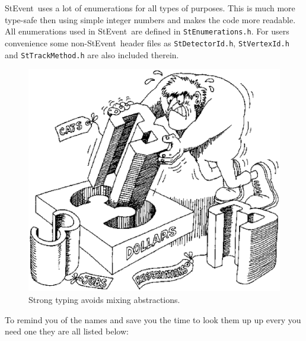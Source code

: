 \documentclass[twoside]{article}
\newcommand{\StEvent}{\textsf{StEvent}}
\begin{document}
\StEvent\ uses a lot of enumerations for all types of purposes. This
is much more type-safe then using simple integer numbers and makes the
code more readable. All enumerations used in \StEvent\ are defined in
\texttt{StEnumerations.h}.  For users convenience some non-\StEvent\
header files as \texttt{StDetectorId.h}, \texttt{StVertexId.h} and
\texttt{StTrackMethod.h} are also included therein.
\begin{figure}[htb]
    \begin{center}
        \includegraphics[width=0.45\textheight]{cartoon2.eps}
        \caption{Strong typing avoids mixing abstractions.}
    \end{center}
\end{figure}
To remind you of the names and save you the time to look them up up
every you need one they are all listed below:
\end{document}
